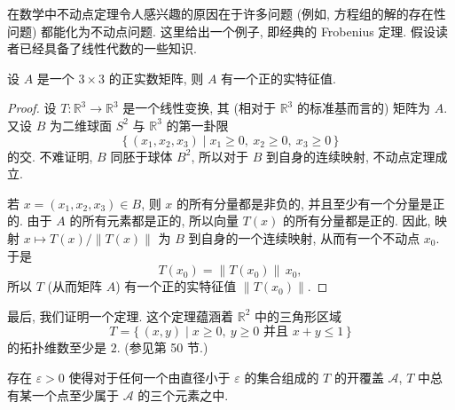 在数学中不动点定理令人感兴趣的原因在于许多问题 (例如, 方程组的解的存在性问题) 都能化为不动点问题. 这里给出一个例子, 即经典的 Frobenius 定理. 假设读者已经具备了线性代数的一些知识.

\begin{corollary}
\label{corollary:ch09-sec55-55-7}
设 $A$ 是一个 $3\times 3$ 的正实数矩阵, 则 $A$ 有一个正的实特征值.
\end{corollary}

\begin{proof}
设 $T\colon\mathbb{R}^{3}\to\mathbb{R}^{3}$ 是一个线性变换, 其 (相对于 $\mathbb{R}^{3}$ 的标准基而言的) 矩阵为 $A$. 又设 $B$ 为二维球面 $S^{2}$ 与 $\mathbb{R}^{3}$ 的第一卦限
\[
\{\,(x_{1},x_{2},x_{3})\mid x_{1}\geqslant 0,\ x_{2}\geqslant 0,\ x_{3}\geqslant 0\,\}
\]
的交. 不难证明, $B$ 同胚于球体 $B^{2}$, 所以对于 $B$ 到自身的连续映射, 不动点定理成立.

若 $x=(x_1,x_2,x_3)\in B$, 则 $x$ 的所有分量都是非负的, 并且至少有一个分量是正的. 由于 $A$ 的所有元素都是正的, 所以向量 $T(x)$ 的所有分量都是正的. 因此, 映射 $x\mapsto T(x)/\|T(x)\|$ 为 $B$ 到自身的一个连续映射, 从而有一个不动点 $x_0$. 于是
\[
T(x_{0})=\|T(x_{0})\|\,x_{0},
\]
所以 $T$ (从而矩阵 $A$) 有一个正的实特征值 $\|T(x_0)\|$.
\end{proof}

最后, 我们证明一个定理. 这个定理蕴涵着 $\mathbb{R}^{2}$ 中的三角形区域
\[
T=\{\,(x,y)\mid x\geqslant 0,\ y\geqslant 0\text{ 并且 }x+y\leqslant 1\,\}
\]
的拓扑维数至少是 $2$. (参见第 50 节.)

\begin{theorem}
\label{theorem:ch09-sec55-55-8}
存在 $\varepsilon>0$ 使得对于任何一个由直径小于 $\varepsilon$ 的集合组成的 $T$ 的开覆盖 $\mathcal{A}$, $T$ 中总有某一个点至少属于 $\mathcal{A}$ 的三个元素之中.
\end{theorem}


